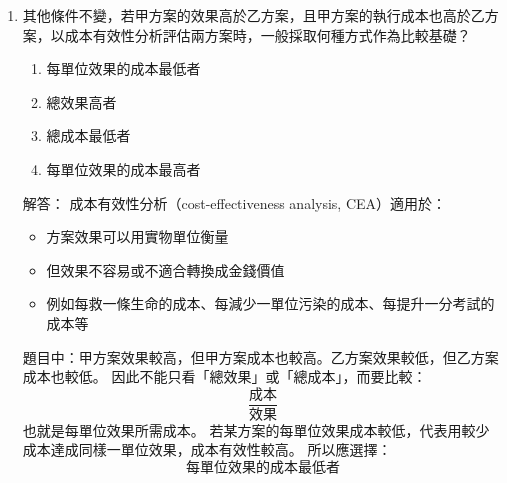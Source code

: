 \documentclass[12pt, a4paper]{article}
\begin{document}
\begin{enumerate}
    \item 其他條件不變，若甲方案的效果高於乙方案，且甲方案的執行成本也高於乙方案，以成本有效性分析評估兩方案時，一般採取何種方式作為比較基礎？
    \begin{enumerate}[label=\Alph*.]
        \item 每單位效果的成本最低者
        \item 總效果高者
        \item 總成本最低者
        \item 每單位效果的成本最高者
    \end{enumerate}
    解答：
    成本有效性分析（cost-effectiveness analysis, CEA）適用於：
    \begin{itemize}
        \item 方案效果可以用實物單位衡量
        \item 但效果不容易或不適合轉換成金錢價值
        \item 例如每救一條生命的成本、每減少一單位污染的成本、每提升一分考試的成本等
    \end{itemize}
    題目中：甲方案效果較高，但甲方案成本也較高。乙方案效果較低，但乙方案成本也較低。
    因此不能只看「總效果」或「總成本」，而要比較：
    \[
    \frac{\text{成本}}{\text{效果}}
    \]
    也就是每單位效果所需成本。
    若某方案的每單位效果成本較低，代表用較少成本達成同樣一單位效果，成本有效性較高。
    所以應選擇：
    \[
    \boxed{\text{每單位效果的成本最低者}}
    \]


\end{enumerate}
\end{document}
